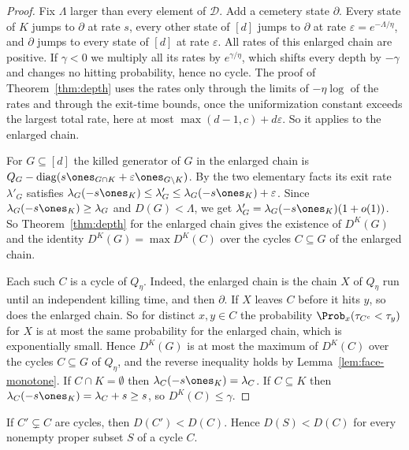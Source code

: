 \begin{proof}
Fix $\Lambda$ larger than every element of $\mathcal D$. Add a cemetery state
$\partial$. Every state of $K$ jumps to $\partial$ at rate $s$, every other state
of $[d]$ jumps to $\partial$ at rate $\varepsilon=e^{-\Lambda/\eta}$, and $\partial$
jumps to every state of $[d]$ at rate $\varepsilon$. All rates of this enlarged
chain are positive. If $\gamma<0$ we multiply all its rates by $e^{\gamma/\eta}$,
which shifts every depth by $-\gamma$ and changes no hitting probability, hence
no cycle. The proof of Theorem~\ref{thm:depth} uses the rates only through the
limits of $-\eta\log$ of the rates and through the exit-time bounds, once the
uniformization constant exceeds the largest total rate, here at most
$\max(d-1,c)+d\varepsilon$. So it applies to the enlarged chain.

For $G\subseteq[d]$ the killed generator of $G$ in the enlarged chain is
$Q_G-\operatorname{diag}(s\ones_{G\cap K}+\varepsilon\ones_{G\setminus K})$. By the two
elementary facts its exit rate $\lambda'_G$ satisfies
$\lambda_G(-s\ones_K)\le\lambda'_G\le\lambda_G(-s\ones_K)+\varepsilon$. Since
$\lambda_G(-s\ones_K)\ge\lambda_G$ and $D(G)<\Lambda$, we get
$\lambda'_G=\lambda_G(-s\ones_K)(1+o(1))$. So Theorem~\ref{thm:depth} for the
enlarged chain gives the existence of $D^K(G)$ and the identity
$D^K(G)=\max D^K(C)$ over the cycles $C\subseteq G$ of the enlarged chain.

Each such $C$ is a cycle of $Q_\eta$. Indeed, the enlarged chain is the chain
$X$ of $Q_\eta$ run until an independent killing time, and then $\partial$. If $X$
leaves $C$ before it hits $y$, so does the enlarged chain. So for distinct
$x,y\in C$ the probability $\Prob_x(\tau_{C^c}<\tau_y)$ for $X$ is at most the
same probability for the enlarged chain, which is exponentially small. Hence
$D^K(G)$ is at most the maximum of $D^K(C)$ over the cycles $C\subseteq G$ of
$Q_\eta$, and the reverse inequality holds by Lemma~\ref{lem:face-monotone}. If
$C\cap K=\emptyset$ then $\lambda_C(-s\ones_K)=\lambda_C$. If $C\subseteq K$ then
$\lambda_C(-s\ones_K)=\lambda_C+s\ge s$, so $D^K(C)\le\gamma$.
\end{proof}

\begin{lemma}\label{lem:nested}
If $C'\subsetneq C$ are cycles, then $D(C')<D(C)$. Hence $D(S)<D(C)$ for every
nonempty proper subset $S$ of a cycle $C$.
\end{lemma}

